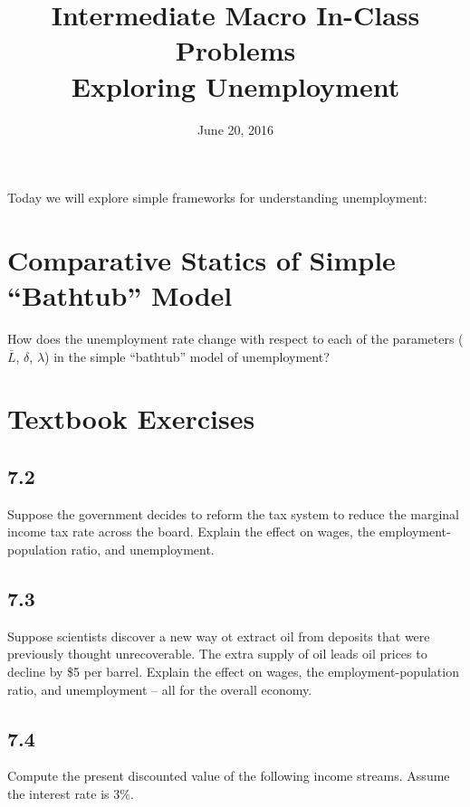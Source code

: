 \documentclass{article}
\begin{document}
\title{Intermediate Macro In-Class Problems \\ \large Exploring Unemployment}

\date{June 20, 2016}

\maketitle

Today we will explore simple frameworks for understanding unemployment:

\section{Comparative Statics of Simple ``Bathtub'' Model}

How does the unemployment rate change with respect to each of the parameters ($\bar{L}$, $\delta$, $\lambda$) in the simple ``bathtub'' model of unemployment?

\section{Textbook Exercises}

\subsection*{7.2}

Suppose the government decides to reform the tax system to reduce the marginal income tax rate across the board. Explain the effect on wages, the employment-population ratio, and unemployment.

\subsection*{7.3}

Suppose scientists discover a new way ot extract oil from deposits that were previously thought unrecoverable. The extra supply of oil leads oil prices to decline by \$5 per barrel. Explain the effect on wages, the employment-population ratio, and unemployment -- all for the overall economy.

\subsection*{7.4}

Compute the present discounted value of the following income streams. Assume the interest rate is 3\%.
\end{document}
